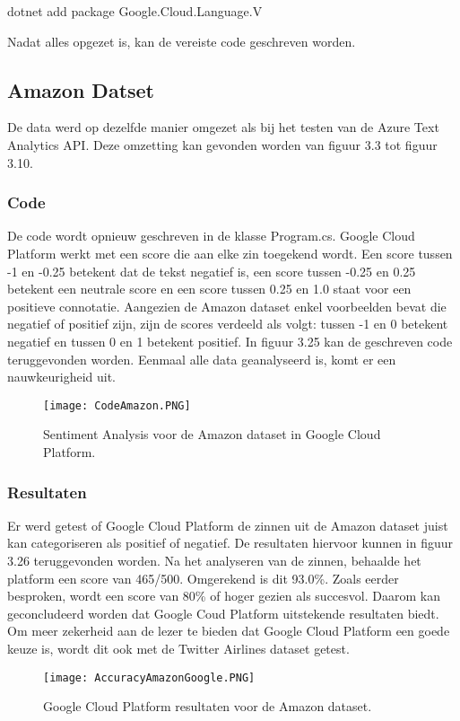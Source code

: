 dotnet add package Google.Cloud.Language.V

Nadat alles opgezet is, kan de vereiste code geschreven worden.


\subsection{Amazon Datset}
\label{amazongoogleplatform}

De data werd op dezelfde manier omgezet als bij het testen van de Azure Text Analytics API. Deze omzetting kan gevonden worden van figuur 3.3 tot figuur 3.10.

\subsubsection{Code}
\label{amazoncodegoogleplatform}
De code wordt opnieuw geschreven in de klasse Program.cs. Google Cloud Platform werkt met een score die aan elke zin toegekend wordt. Een score tussen -1 en -0.25 betekent dat de tekst negatief is, een score tussen -0.25 en 0.25 betekent een neutrale score en een score tussen 0.25 en 1.0 staat voor een positieve connotatie. Aangezien de Amazon dataset enkel voorbeelden bevat die negatief of positief zijn, zijn de scores verdeeld als volgt: tussen -1 en 0 betekent negatief en tussen 0 en 1 betekent positief. In figuur 3.25 kan de geschreven code teruggevonden worden. Eenmaal alle data geanalyseerd is, komt er een nauwkeurigheid uit. 

\begin{figure}[!htbp]
    \texttt{[image: CodeAmazon.PNG]}
    \caption{\label{codeamazon}Sentiment Analysis voor de Amazon dataset in Google Cloud Platform.}
\end{figure}
\FloatBarrier 

\subsubsection{Resultaten}
\label{amazonresultatengoogleplatform}

Er werd getest of Google Cloud Platform de zinnen uit de Amazon dataset juist kan categoriseren als positief of negatief. De resultaten hiervoor kunnen in figuur 3.26 teruggevonden worden. Na het analyseren van de zinnen, behaalde het platform een score van 465/500. Omgerekend is dit 93.0\%. Zoals eerder besproken, wordt een score van 80\% of hoger gezien als succesvol. Daarom kan geconcludeerd worden dat Google Coud Platform uitstekende resultaten biedt. Om meer zekerheid aan de lezer te bieden dat Google Cloud Platform een goede keuze is, wordt dit ook met de Twitter Airlines dataset getest. 
\begin{figure}[!htbp]
    \texttt{[image: AccuracyAmazonGoogle.PNG]}
    \caption{\label{accuracyTwitter}Google Cloud Platform resultaten voor de Amazon dataset.}
\end{figure}
\FloatBarrier 

